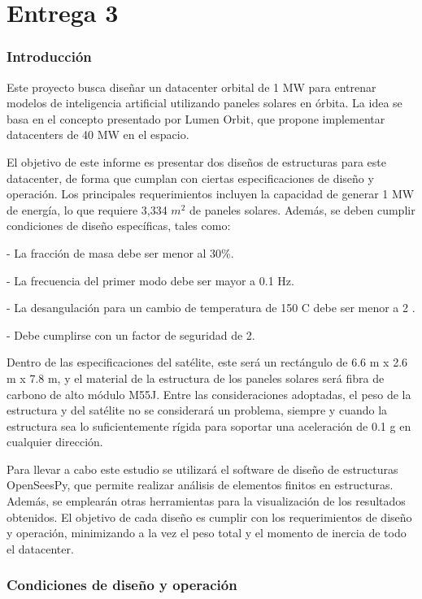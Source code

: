 \part{Entrega 3}

\section{Introducción}

Este proyecto busca diseñar un datacenter orbital de 1 MW para entrenar modelos de inteligencia artificial utilizando paneles solares en órbita. La idea se basa en el concepto presentado por Lumen Orbit, que propone implementar datacenters de 40 MW en el espacio.

El objetivo de este informe es presentar dos diseños de estructuras para este datacenter, de forma que cumplan con ciertas especificaciones de diseño y operación. Los principales requerimientos incluyen la capacidad de generar 1 MW de energía, lo que requiere 3,334 $m^2$ de paneles solares. Además, se deben cumplir condiciones de diseño específicas, tales como:

- La fracción de masa debe ser menor al 30\%.

- La frecuencia del primer modo debe ser mayor a 0.1 Hz.

- La desangulación para un cambio de temperatura de 150 \textdegree{}C debe ser menor a 2 \textdegree.

- Debe cumplirse con un factor de seguridad de 2.

Dentro de las especificaciones del satélite, este será un rectángulo de 6.6 m x 2.6 m x 7.8 m, y el material de la estructura de los paneles solares será fibra de carbono de alto módulo M55J. Entre las consideraciones adoptadas, el peso de la estructura y del satélite no se considerará un problema, siempre y cuando la estructura sea lo suficientemente rígida para soportar una aceleración de 0.1 g en cualquier dirección.

Para llevar a cabo este estudio se utilizará el software de diseño de estructuras OpenSeesPy, que permite realizar análisis de elementos finitos en estructuras. Además, se emplearán otras herramientas para la visualización de los resultados obtenidos. El objetivo de cada diseño es cumplir con los requerimientos de diseño y operación, minimizando a la vez el peso total y el momento de inercia de todo el datacenter.

\newpage
\section{Condiciones de diseño y operación}

